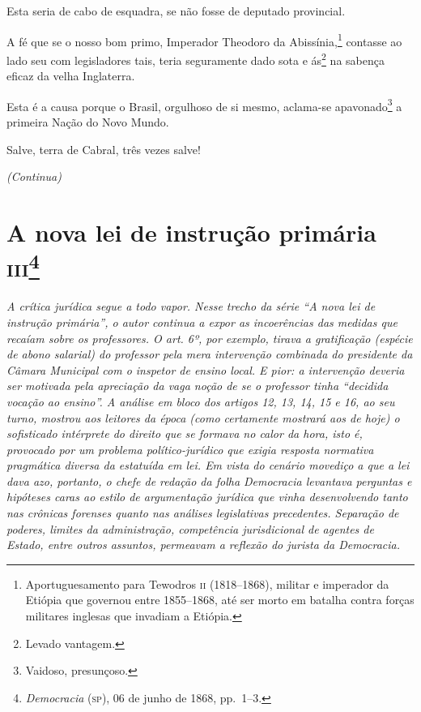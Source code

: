 Esta seria de cabo de esquadra, se não fosse de deputado provincial.

A fé que se o nosso bom primo, Imperador Theodoro da
Abissínia,\footnote{Aportuguesamento para Tewodros \textsc{ii} (1818--1868),
  militar e imperador da Etiópia que governou entre 1855--1868, até ser
  morto em batalha contra forças militares inglesas que invadiam a
  Etiópia.} contasse ao lado seu com legisladores tais, teria
seguramente dado sota e ás\footnote{Levado vantagem.} na sabença
eficaz da velha Inglaterra.

Esta é a causa porque o Brasil, orgulhoso de si mesmo, aclama-se
apavonado\footnote{Vaidoso, presunçoso.} a primeira Nação do Novo
Mundo.

Salve, terra de Cabral, três vezes salve!

\begin{center}
\emph{(Continua)}
\end{center}

\chapter{A nova lei de instrução primária \textsc{iii}\footnote{\emph{Democracia} (\textsc{sp}), 06 de junho de 1868, pp.~1--3.}} %

\begin{didascalia}\itshape
A crítica jurídica segue a todo vapor. Nesse trecho da série ``A nova
lei de instrução primária'', o autor continua a expor as
incoerências das medidas que recaíam sobre os professores. O art. 6º,
por exemplo, tirava a gratificação (espécie de abono salarial) do
professor pela mera intervenção combinada do presidente da Câmara
Municipal com o inspetor de ensino local. E pior: a intervenção deveria
ser motivada pela apreciação da vaga noção de se o professor tinha
``decidida vocação ao ensino''. A análise em bloco dos artigos 12, 13, 14,
15 e 16, ao seu turno, mostrou aos leitores da época (como certamente
mostrará aos de hoje) o sofisticado intérprete do direito que se formava
no calor da hora, isto é, provocado por um problema político-jurídico
que exigia resposta normativa pragmática diversa da estatuída em lei. Em
vista do cenário movediço a que a lei dava azo, portanto, o chefe de
redação da folha \textnormal{Democracia} levantava perguntas e hipóteses caras
ao estilo de argumentação jurídica que vinha desenvolvendo tanto nas
crônicas forenses quanto nas análises legislativas precedentes.
Separação de poderes, limites da administração, competência
jurisdicional de agentes de Estado, entre outros assuntos, permeavam a
reflexão do jurista da \textnormal{Democracia}.
\end{didascalia}



